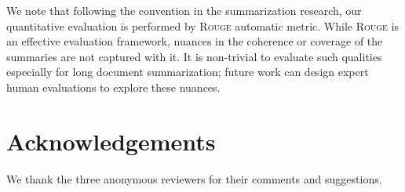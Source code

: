 \documentclass[11pt,a4paper]{article}
\begin{document}
We note that following the convention in the summarization research, our quantitative evaluation is performed by \textsc{Rouge} automatic metric. While \textsc{Rouge} is an effective evaluation framework, nuances in the coherence or coverage of the summaries are not captured with it. It is non-trivial to evaluate such qualities especially for long document summarization; future work can design expert human evaluations to explore these nuances.

\section*{Acknowledgements}
We thank the three anonymous reviewers for their comments and suggestions.

\bigskip






\end{document}
